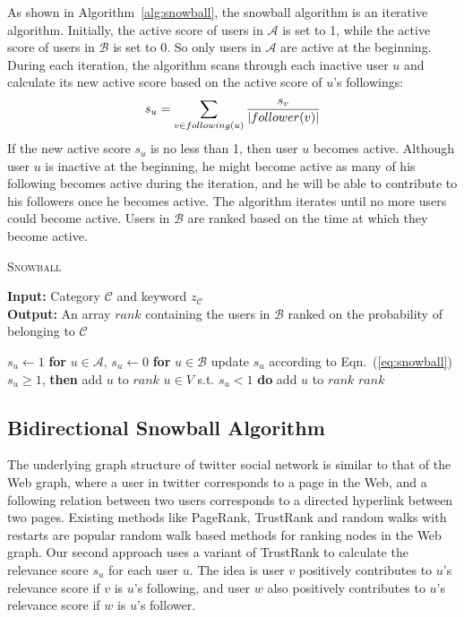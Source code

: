 \documentclass{article}
\begin{document}
As shown in Algorithm~\ref{alg:snowball}, the snowball algorithm is an iterative algorithm. Initially, the active score of users in $\mathcal{A}$ is set to 1, while the active score of users in $\mathcal{B}$ is set to 0. So only users in $\mathcal{A}$ are active at the beginning. During each iteration, the algorithm scans through each inactive user $u$ and calculate its new active score based on the active score of $u$'s followings:
\begin{equation}\label{eq:snowball}
s_u = \sum_{v \in following(u)} \frac{s_v}{|follower(v)|}
\end{equation}
If the new active score $s_u$ is no less than 1, then user $u$ becomes active. Although user $u$ is inactive at the beginning, he might become active as many of his following becomes active during the iteration, and he will be able to contribute to his followers once he becomes active. The algorithm iterates until no more users could become active. Users in $\mathcal{B}$ are ranked based on the time at which they become active.

\begin{algorithm}[htbp]
\caption{\textsc{Snowball}}
\textbf{Input: }{Category $\mathcal{C}$ and keyword $z_{\mathcal{C}}$}\\
\textbf{Output: }{An array $rank$ containing the users in $\mathcal{B}$ ranked on the probability of belonging to $\mathcal{C}$}
\begin{algorithmic}[1]
\STATE $s_u \leftarrow 1$ {\bf for} $u \in \mathcal{A}$, $s_u \leftarrow 0$ {\bf for} $u \in \mathcal{B}$
    \STATE update $s_u$ according to Eqn.~(\ref{eq:snowball})
     $s_u \geq 1$, {\bf then} add $u$ to $rank$
\ENDFOR
\ENDWHILE
{} $u \in V$ s.t. $s_u < 1$ {\bf do} add $u$ to $rank$
\RETURN $rank$
\end{algorithmic}
\label{alg:snowball}
\end{algorithm}

\subsection{Bidirectional Snowball Algorithm}

The underlying graph structure of twitter social network is similar to that of the Web graph, where a user in twitter corresponds to a page in the Web, and a following relation between two users corresponds to a directed hyperlink between two pages. Existing methods like PageRank\cite{page1999pagerank}, TrustRank\cite{gyngyi2004combating} and random walks with restarts\cite{tong2006fast} are popular random walk based methods for ranking nodes in the Web graph. Our second approach uses a variant of TrustRank to calculate the relevance score $s_u$ for each user $u$. The idea is user $v$ positively contributes to $u$'s relevance score if $v$ is $u$'s following, and user $w$ also positively contributes to $u$'s relevance score if $w$ is $u$'s follower.
\end{document}

